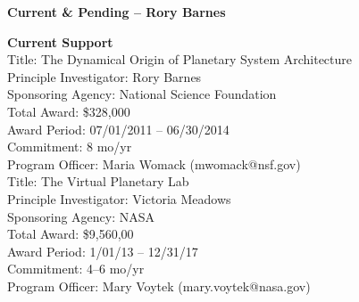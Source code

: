 \documentclass[12pt]{article}
\begin{document}
\begin{center}\Large{\bf Current \& Pending -- Rory Barnes}\end{center}

\noindent\textbf{Current Support}\\

\noindent Title: The Dynamical Origin of Planetary System Architecture\\
Principle Investigator: Rory Barnes\\
Sponsoring Agency: National Science Foundation\\
Total Award: \$328,000\\
Award Period: 07/01/2011 -- 06/30/2014\\
Commitment: 8 mo/yr\\
Program Officer: Maria Womack (mwomack@nsf.gov)\\

\noindent Title: The Virtual Planetary Lab\\
Principle Investigator: Victoria Meadows\\
Sponsoring Agency: NASA\\
Total Award: \$9,560,00\\
Award Period: 1/01/13 -- 12/31/17\\
Commitment: 4--6 mo/yr\\
Program Officer: Mary Voytek (mary.voytek@nasa.gov)\\


\end{document}
